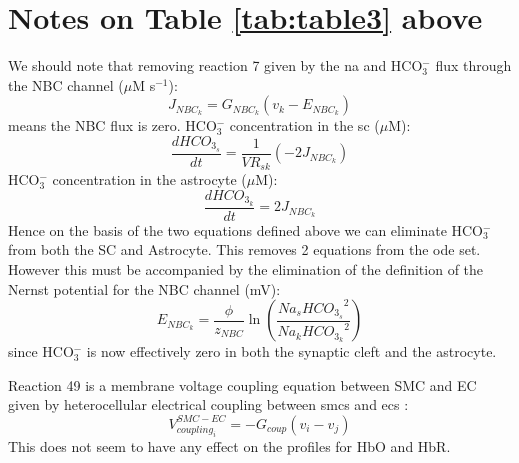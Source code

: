 \documentclass[]{article}
\newcommand{\hco}{HCO$_3^-$\xspace}
\newcommand{\mus}{$\mu$M s$^{-1}$\xspace}
\newcommand{\uM}{$\mu$M\xspace}
\newcommand{\na}{\gls{na}\xspace}
\begin{document}
\section{Notes on Table \ref{tab:table3} above}
We should note that removing reaction 7 given by the \na and \hco flux through the NBC channel (\mus): 
\begin{equation} \label{eq:J_NBC}
J_{NBC_k}=G_{NBC_k}\left(  v_k -E_{NBC_k}  \right)
\end{equation}
means the NBC flux is zero. 
\hco concentration in the \gls{sc} (\uM):
\begin{equation} \label{eq:HCOEx}
\frac{d HCO_{3_{s}}}{dt}=  \frac{1}{VR_{sk}} \left( -2 J_{NBC_{k}} \right)
\end{equation} 
\hco concentration in the astrocyte (\uM):
\begin{equation} \label{eq:HCOInt}
\frac{d HCO_{3_k}}{dt}= 2 J_{NBC_{k}} 
\end{equation}
Hence on the basis of the two equations defined above we can eliminate \hco from both the SC and Astrocyte. This removes 2 equations from the ode set. However this must be accompanied by the elimination of the definition of the Nernst potential for the NBC channel (mV):
\begin{equation} \label{eq:E_NBC}
E_{NBC_k}=\frac{\phi}{z_{NBC}}\ln\left( \frac{Na_s {HCO_{3_s}}^2}{Na_k {HCO_{3_k}}^2}\right) 
\end{equation}
since \hco is now effectively zero in both the synaptic cleft and the astrocyte. 

Reaction 49 is a membrane voltage coupling equation between SMC and EC given by heterocellular electrical coupling between \glspl{smc} and \glspl{ec} :
\begin{equation} \label{eq:Vcouplingi}
V_{coupling_{i}}^{SMC-EC}= -G_{coup}(v_{i}-v_{j})
\end{equation}
This does not seem to have any effect on the profiles for HbO and HbR. 
\end{document}
